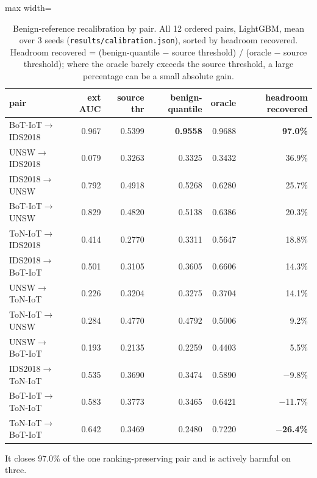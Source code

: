 \documentclass[preprint,12pt]{elsarticle}
\begin{document}
\begin{table}[htbp]\centering\scriptsize
\caption{Benign-reference recalibration by pair. All 12 ordered pairs, LightGBM, mean over 3 seeds (\texttt{results/calibration.json}), sorted by headroom recovered. Headroom recovered = (benign-quantile $-$ source threshold) / (oracle $-$ source threshold); where the oracle barely exceeds the source threshold, a large percentage can be a small absolute gain.}
\begin{adjustbox}{max width=\textwidth}\begin{tabular}{lrrrrr}
\toprule
pair & ext AUC & source thr & benign-quantile & oracle & headroom recovered \\
\midrule
BoT-IoT$\rightarrow$IDS2018 & 0.967 & 0.5399 & \textbf{0.9558} & 0.9688 & \textbf{97.0\%} \\
UNSW$\rightarrow$IDS2018 & 0.079 & 0.3263 & 0.3325 & 0.3432 & 36.9\% \\
IDS2018$\rightarrow$UNSW & 0.792 & 0.4918 & 0.5268 & 0.6280 & 25.7\% \\
BoT-IoT$\rightarrow$UNSW & 0.829 & 0.4820 & 0.5138 & 0.6386 & 20.3\% \\
ToN-IoT$\rightarrow$IDS2018 & 0.414 & 0.2770 & 0.3311 & 0.5647 & 18.8\% \\
IDS2018$\rightarrow$BoT-IoT & 0.501 & 0.3105 & 0.3605 & 0.6606 & 14.3\% \\
UNSW$\rightarrow$ToN-IoT & 0.226 & 0.3204 & 0.3275 & 0.3704 & 14.1\% \\
ToN-IoT$\rightarrow$UNSW & 0.284 & 0.4770 & 0.4792 & 0.5006 & 9.2\% \\
UNSW$\rightarrow$BoT-IoT & 0.193 & 0.2135 & 0.2259 & 0.4403 & 5.5\% \\
IDS2018$\rightarrow$ToN-IoT & 0.535 & 0.3690 & 0.3474 & 0.5890 & $-$9.8\% \\
BoT-IoT$\rightarrow$ToN-IoT & 0.583 & 0.3773 & 0.3465 & 0.6421 & $-$11.7\% \\
ToN-IoT$\rightarrow$BoT-IoT & 0.642 & 0.3469 & 0.2480 & 0.7220 & \textbf{$-$26.4\%} \\
\bottomrule
\end{tabular}\end{adjustbox}
\end{table}

It closes 97.0\% of the one ranking-preserving pair and is actively harmful on three.
\end{document}
